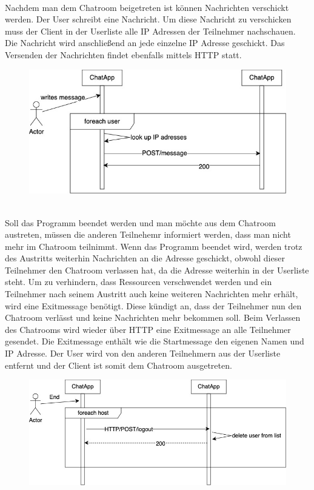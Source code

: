 \\
Nachdem man dem Chatroom beigetreten ist können Nachrichten verschickt werden. Der User schreibt eine Nachricht. 
Um diese Nachricht zu verschicken muss der Client in der Userliste alle IP Adressen der Teilnehmer nachschauen. Die Nachricht wird anschließend 
an jede einzelne IP Adresse geschickt. Das Versenden der Nachrichten findet ebenfalls mittels HTTP statt.
\begin{figure}[h]
    \centering
    \includegraphics[scale=0.4]{Images/Kommunikation_Sequenzdiagramm.jpg}
\end{figure}
\\
Soll das Programm beendet werden und man möchte aus dem Chatroom austreten, müssen die anderen Teilnehemr informiert werden, dass man nicht mehr im Chatroom teilnimmt.
Wenn das Programm beendet wird, werden trotz des Austritts weiterhin Nachrichten an die Adresse geschickt, obwohl dieser Teilnehmer den Chatroom verlassen hat, da die Adresse weiterhin in der Userliste steht.
Um zu verhindern, dass Ressourcen verschwendet werden und ein Teilnehmer nach seinem Austritt auch keine weiteren Nachrichten mehr erhält, wird eine Exitmessage benötigt. Diese kündigt an, dass der Teilnehmer nun 
den Chatroom verlässt und keine Nachrichten mehr bekommen soll. 
Beim Verlassen des Chatrooms wird wieder über HTTP eine Exitmessage an alle Teilnehmer gesendet. Die Exitmessage enthält wie die Startmessage den eigenen Namen und IP Adresse.
Der User wird von den anderen Teilnehmern aus der Userliste entfernt und der Client ist somit dem Chatroom ausgetreten. 
\begin{figure}[h]
    \centering
    \includegraphics[scale=0.4]{Images/Exit_Sequenzdiagramm.jpg}
\end{figure}